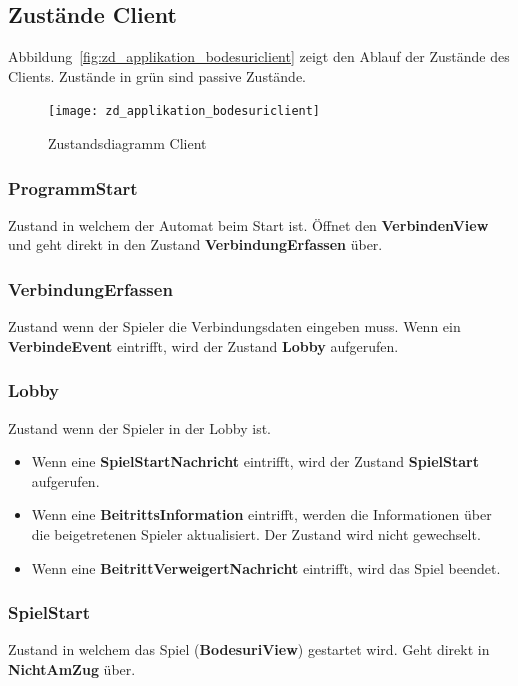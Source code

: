 \documentclass[12pt,halfparskip]{scrartcl}
\begin{document}
\subsection{Zustände Client}
\label{sub:zustände_client}
Abbildung~\vref{fig:zd_applikation_bodesuriclient} zeigt den Ablauf der Zustände des Clients. Zustände in grün sind passive Zustände.
\begin{figure}[h]
	\centering
	\texttt{[image: zd\_applikation\_bodesuriclient]}
	\caption{Zustandsdiagramm Client}
	\label{fig:zd_applikation_bodesuriclient}
\end{figure}

\subsubsection{ProgrammStart}
\label{ssub:programmstart}
Zustand in welchem der Automat beim Start ist. Öffnet den \textbf{VerbindenView} und geht direkt in den Zustand \textbf{VerbindungErfassen} über.


\subsubsection{VerbindungErfassen}
\label{ssub:verbinungerfassen}
Zustand wenn der Spieler die Verbindungsdaten eingeben muss. Wenn ein \textbf{VerbindeEvent} eintrifft, wird der Zustand \textbf{Lobby} aufgerufen.

\subsubsection{Lobby}
\label{ssub:lobby}
Zustand wenn der Spieler in der Lobby ist.
\begin{itemize}
	\item Wenn eine \textbf{SpielStartNachricht} eintrifft, wird der Zustand \textbf{SpielStart} aufgerufen.
	\item Wenn eine \textbf{BeitrittsInformation} eintrifft, werden die Informationen über die beigetretenen Spieler aktualisiert. Der Zustand wird nicht gewechselt.
	\item Wenn eine \textbf{BeitrittVerweigertNachricht} eintrifft, wird das Spiel beendet.
\end{itemize}

\subsubsection{SpielStart}
\label{ssub:spielstart}
Zustand in welchem das Spiel (\textbf{BodesuriView}) gestartet wird. Geht direkt in \textbf{NichtAmZug} über.
\end{document}
